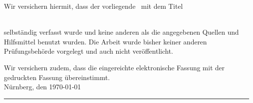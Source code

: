 Wir versichern hiermit, dass der vorliegende \arbeit~mit dem Titel

\emph{\titel}\\
selbständig verfasst wurde und keine anderen als die angegebenen Quellen und Hilfsmittel benutzt wurden. Die Arbeit wurde bisher keiner anderen Prüfungsbehörde vorgelegt und auch nicht veröffentlicht.


Wir versichern zudem, dass die eingereichte elektronische Fassung mit der gedruckten Fassung übereinstimmt.\\[10ex]

Nürnberg, den \today \\[4ex]


\rule[-0.2cm]{10cm}{0.5pt} \\

\textsc{\autor} \\[10ex]
